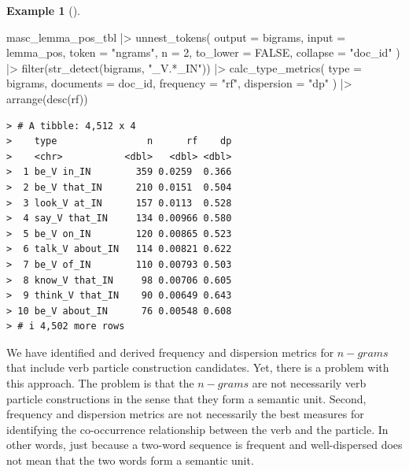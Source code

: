 \documentclass[
  letterpaper,
  DIV=11,
  numbers=noendperiod]{scrreport}
\newenvironment{Shaded}{\begin{snugshade}}{\end{snugshade}}
\newcommand{\AttributeTok}[1]{\textcolor[rgb]{0.00,0.00,0.00}{#1}}
\newcommand{\ConstantTok}[1]{\textcolor[rgb]{0.00,0.00,0.00}{#1}}
\newcommand{\DecValTok}[1]{\textcolor[rgb]{0.00,0.00,0.00}{#1}}
\newcommand{\FunctionTok}[1]{\textcolor[rgb]{0.00,0.00,0.00}{#1}}
\newcommand{\NormalTok}[1]{\textcolor[rgb]{0.00,0.00,0.00}{#1}}
\newcommand{\SpecialCharTok}[1]{\textcolor[rgb]{0.00,0.00,0.00}{#1}}
\newcommand{\StringTok}[1]{\textcolor[rgb]{0.00,0.00,0.00}{#1}}
\theoremstyle{definition}
\newtheorem{example}{Example}[chapter]
\theoremstyle{remark}
\begin{document}
\begin{example}[]
\begin{Shaded}
\begin{Highlighting}[]
\NormalTok{masc\_lemma\_pos\_tbl }\SpecialCharTok{|\textgreater{}} 
  \FunctionTok{unnest\_tokens}\NormalTok{(}
    \AttributeTok{output =}\NormalTok{ bigrams, }
    \AttributeTok{input =}\NormalTok{ lemma\_pos, }
    \AttributeTok{token =} \StringTok{"ngrams"}\NormalTok{, }
    \AttributeTok{n =} \DecValTok{2}\NormalTok{, }
    \AttributeTok{to\_lower =} \ConstantTok{FALSE}\NormalTok{,}
    \AttributeTok{collapse =} \StringTok{"doc\_id"}
\NormalTok{  ) }\SpecialCharTok{|\textgreater{}} 
  \FunctionTok{filter}\NormalTok{(}\FunctionTok{str\_detect}\NormalTok{(bigrams, }\StringTok{"\_V.*\_IN"}\NormalTok{)) }\SpecialCharTok{|\textgreater{}} 
  \FunctionTok{calc\_type\_metrics}\NormalTok{(}
    \AttributeTok{type =}\NormalTok{ bigrams, }
    \AttributeTok{documents =}\NormalTok{ doc\_id, }
    \AttributeTok{frequency =} \StringTok{"rf"}\NormalTok{,}
    \AttributeTok{dispersion =} \StringTok{"dp"}
\NormalTok{  ) }\SpecialCharTok{|\textgreater{}} 
  \FunctionTok{arrange}\NormalTok{(}\FunctionTok{desc}\NormalTok{(rf))}
\end{Highlighting}
\end{Shaded}

\begin{verbatim}
> # A tibble: 4,512 x 4
>    type                n      rf    dp
>    <chr>           <dbl>   <dbl> <dbl>
>  1 be_V in_IN        359 0.0259  0.366
>  2 be_V that_IN      210 0.0151  0.504
>  3 look_V at_IN      157 0.0113  0.528
>  4 say_V that_IN     134 0.00966 0.580
>  5 be_V on_IN        120 0.00865 0.523
>  6 talk_V about_IN   114 0.00821 0.622
>  7 be_V of_IN        110 0.00793 0.503
>  8 know_V that_IN     98 0.00706 0.605
>  9 think_V that_IN    90 0.00649 0.643
> 10 be_V about_IN      76 0.00548 0.608
> # i 4,502 more rows
\end{verbatim}

\end{example}

We have identified and derived frequency and dispersion metrics for
\(n-grams\) that include verb particle construction candidates. Yet,
there is a problem with this approach. The problem is that the
\(n-grams\) are not necessarily verb particle constructions in the sense
that they form a semantic unit. Second, frequency and dispersion metrics
are not necessarily the best measures for identifying the co-occurrence
relationship between the verb and the particle. In other words, just
because a two-word sequence is frequent and well-dispersed does not mean
that the two words form a semantic unit.
\end{document}
